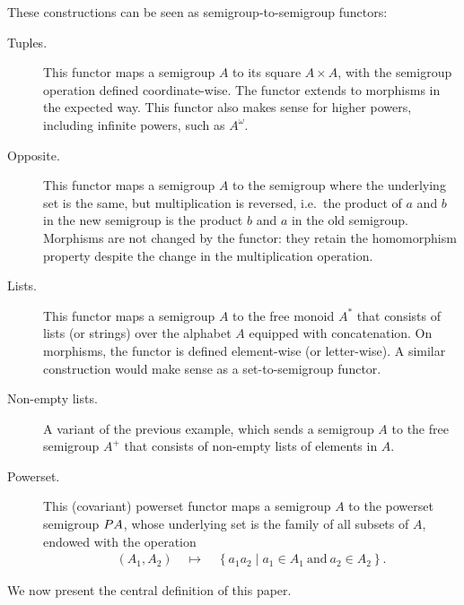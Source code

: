  \begin{example}\label{ex:functors}
 These constructions can be seen as semigroup-to-semigroup functors:
 \begin{description}
 \item[Tuples.] This functor maps a semigroup $A$ to its square $A \times A$, with the semigroup operation defined coordinate-wise. The functor extends to morphisms in the expected way. This functor also makes sense for higher powers, including infinite powers, such as $A^\omega$.
 \item[Opposite.] This functor maps a semigroup $A$ to the semigroup where the underlying set is the same, but multiplication is reversed, i.e.~the product of $a$ and $b$ in the new semigroup is the product $b$ and $a$ in the old semigroup. Morphisms are not changed by the functor: they retain the homomorphism property despite the change in the multiplication operation.
 \item[Lists.] This functor maps a semigroup $A$ to the free monoid $A^*$ that consists of lists (or strings) over the alphabet $A$ equipped with concatenation. On morphisms, the functor is defined element-wise (or letter-wise). A similar construction would make sense as a set-to-semigroup functor.
 \item[Non-empty lists.] A variant of the previous example, which sends a
   semigroup $A$ to the free semigroup $A^+$ that consists of non-empty lists of
   elements in $A$.
 \item[Powerset.] This (covariant) powerset functor maps a semigroup $A$ to the powerset semigroup $\powerset A$, whose underlying set is the family of all subsets of $A$, endowed with the operation
 \begin{align*}
 (A_1,A_2) \quad \mapsto \quad \left\{a_1 a_2 \mid a_1 \in A_1\ \text{and}\ a_2 \in A_2\right\}.
 \end{align*}
 \end{description}
 \end{example}

\noindent
 We now present the central definition of this paper. 

